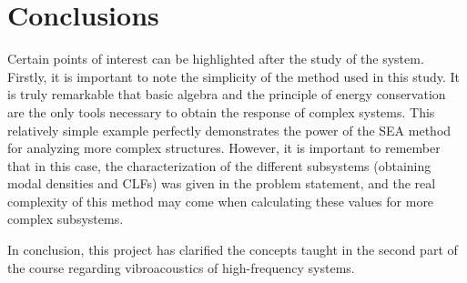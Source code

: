 \section{Conclusions} \label{sec: conc}
Certain points of interest can be highlighted after the study of the system. 
Firstly, it is important to note the simplicity of the method used in this study. It is truly remarkable that basic algebra and the principle of energy conservation are the only tools necessary to obtain the response of complex systems. This relatively simple example perfectly demonstrates the power of the SEA method for analyzing more complex structures. However, it is important to remember that in this case, the characterization of the different subsystems (obtaining modal densities and CLFs) was given in the problem statement, and the real complexity of this method may come when calculating these values for more complex subsystems.

In conclusion, this project has clarified the concepts taught in the second part of the course regarding vibroacoustics of high-frequency systems.